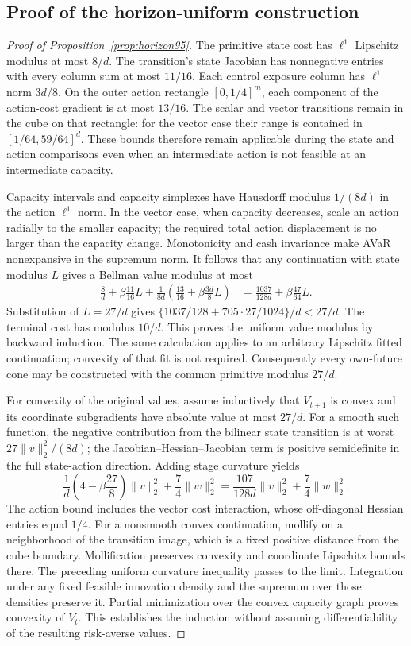 \subsection{Proof of the horizon-uniform construction}
\begin{proof}[Proof of Proposition~\ref{prop:horizon95}]
The primitive state cost has $\ell^1$ Lipschitz modulus at most $8/d$. The transition's state Jacobian has nonnegative entries with every column sum at most $11/16$. Each control exposure column has $\ell^1$ norm $3d/8$. On the outer action rectangle $[0,1/4]^m$, each component of the action-cost gradient is at most $13/16$. The scalar and vector transitions remain in the cube on that rectangle: for the vector case their range is contained in $[1/64,59/64]^d$. These bounds therefore remain applicable during the state and action comparisons even when an intermediate action is not feasible at an intermediate capacity.

Capacity intervals and capacity simplexes have Hausdorff modulus $1/(8d)$ in the action $\ell^1$ norm. In the vector case, when capacity decreases, scale an action radially to the smaller capacity; the required total action displacement is no larger than the capacity change. Monotonicity and cash invariance make AVaR nonexpansive in the supremum norm. It follows that any continuation with state modulus $L$ gives a Bellman value modulus at most
\begin{align*}
 \frac8d+\beta\frac{11}{16}L
  +\frac1{8d}\left(\frac{13}{16}+\beta\frac{3d}{8}L\right)
 &=\frac{1037}{128d}+\beta\frac{47}{64}L.
\end{align*}
Substitution of $L=27/d$ gives $\{1037/128+705\cdot27/1024\}/d<27/d$. The terminal cost has modulus $10/d$. This proves the uniform value modulus by backward induction. The same calculation applies to an arbitrary Lipschitz fitted continuation; convexity of that fit is not required. Consequently every own-future cone may be constructed with the common primitive modulus $27/d$.

For convexity of the original values, assume inductively that $V_{t+1}$ is convex and its coordinate subgradients have absolute value at most $27/d$. For a smooth such function, the negative contribution from the bilinear state transition is at worst $27\|v\|_2^2/(8d)$; the Jacobian--Hessian--Jacobian term is positive semidefinite in the full state-action direction. Adding stage curvature yields
\[
 \frac1d\left(4-\beta\frac{27}{8}\right)\|v\|_2^2
       +\frac74\|w\|_2^2
 =\frac{107}{128d}\|v\|_2^2+\frac74\|w\|_2^2.
\]
The action bound includes the vector cost interaction, whose off-diagonal Hessian entries equal $1/4$. For a nonsmooth convex continuation, mollify on a neighborhood of the transition image, which is a fixed positive distance from the cube boundary. Mollification preserves convexity and coordinate Lipschitz bounds there. The preceding uniform curvature inequality passes to the limit. Integration under any fixed feasible innovation density and the supremum over those densities preserve it. Partial minimization over the convex capacity graph proves convexity of $V_t$. This establishes the induction without assuming differentiability of the resulting risk-averse values.


\end{proof}
